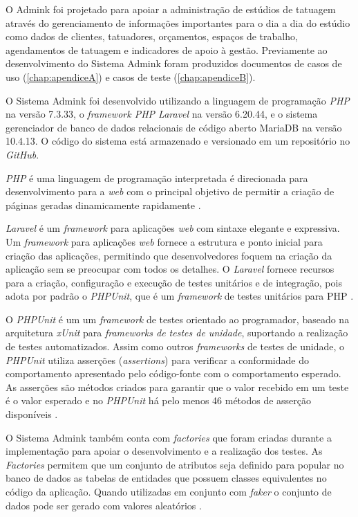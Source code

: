     O Admink foi projetado para apoiar a administração de estúdios de tatuagem através do gerenciamento de informações importantes para o dia a dia do estúdio como dados de clientes, tatuadores, orçamentos, espaços de trabalho, agendamentos de tatuagem e indicadores de apoio à gestão. Previamente ao desenvolvimento do Sistema Admink foram produzidos documentos de casos de uso (\autoref{chap:apendiceA}) e casos de teste (\autoref{chap:apendiceB}).

    O Sistema Admink foi desenvolvido utilizando a linguagem de programação \emph{PHP} na versão 7.3.33, o \emph{framework PHP Laravel} na versão 6.20.44, e o sistema gerenciador de banco de dados relacionais de código aberto MariaDB na versão 10.4.13. O código do sistema está armazenado e versionado em um repositório no \emph{GitHub}.

    \emph{PHP} é uma linguagem de programação interpretada é direcionada para desenvolvimento para a \emph{web} com o principal objetivo de permitir a criação de páginas geradas dinamicamente rapidamente \cite{PHP2021}.

    \emph{Laravel} é um \emph{framework} para aplicações \emph{web} com sintaxe elegante e expressiva. Um \emph{framework} para aplicações \emph{web} fornece a estrutura e ponto inicial para criação das aplicações, permitindo que desenvolvedores foquem na criação da aplicação sem se preocupar com todos os detalhes. O \emph{Laravel} fornece recursos para a criação, configuração e execução de testes unitários e de integração, pois adota por padrão o \emph{PHPUnit}, que é um \emph{framework} de testes unitários para PHP \cite{Laravel2021}.

    O \emph{PHPUnit} é um um \emph{framework} de testes orientado ao programador, baseado na arquitetura \emph{xUnit} para \emph{frameworks de testes de unidade}, suportando a realização de testes automatizados. Assim como outros \emph{frameworks} de testes de unidade, o \emph{PHPUnit} utiliza asserções (\emph{assertions}) para verificar a conformidade do comportamento apresentado pelo código-fonte com o comportamento esperado. As asserções são métodos criados para garantir que o valor recebido em um teste é o valor esperado e no \emph{PHPUnit} há pelo menos 46 métodos de asserção disponíveis \cite{PHPcombr}.
    
    O Sistema Admink também conta com \emph{factories} que foram criadas durante a implementação para apoiar o desenvolvimento e a realização dos testes. As \emph{Factories} permitem que um conjunto de atributos seja definido para popular no banco de dados as tabelas de entidades que possuem classes equivalentes no código da aplicação. Quando utilizadas em conjunto com \emph{faker} o conjunto de dados pode ser gerado com valores aleatórios \cite{Laravel2021}.

